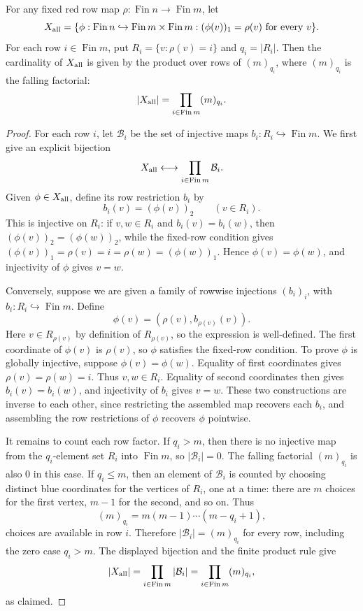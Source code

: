 \begin{lemma}
For any fixed red row map $\rho: \operatorname{Fin}n \to \operatorname{Fin}m$, let
\[
X_{\rm all}
=\{\phi:\operatorname{Fin}n\hookrightarrow
\operatorname{Fin}m\times\operatorname{Fin}m:
(\phi(v))_1=\rho(v)\text{ for every }v\}.
\]
For each row $i\in\operatorname{Fin}m$, put $R_i=\{v:\rho(v)=i\}$ and $q_i=|R_i|$.
Then the cardinality of $X_{\rm all}$ is given by the product over rows of $(m)_{q_i}$, where $(m)_{q_i}$ is the falling factorial:
\[
|X_{\rm all}| = \prod_{i\in\operatorname{Fin}m} (m)_{q_i}.
\]
\end{lemma}
\begin{proof}
For each row \(i\), let \(\mathcal B_i\) be the set of injective maps
\(b_i:R_i\hookrightarrow \operatorname{Fin}m\).  We first give an explicit
bijection
\[
X_{\rm all}\longleftrightarrow \prod_{i\in\operatorname{Fin}m}\mathcal B_i .
\]
Given \(\phi\in X_{\rm all}\), define its row restriction \(b_i\) by
\[
b_i(v)=(\phi(v))_2\qquad (v\in R_i).
\]
This is injective on \(R_i\): if \(v,w\in R_i\) and \(b_i(v)=b_i(w)\), then
\((\phi(v))_2=(\phi(w))_2\), while the fixed-row condition gives
\((\phi(v))_1=\rho(v)=i=\rho(w)=(\phi(w))_1\).  Hence
\(\phi(v)=\phi(w)\), and injectivity of \(\phi\) gives \(v=w\).

Conversely, suppose we are given a family of rowwise injections
\((b_i)_i\), with \(b_i:R_i\hookrightarrow\operatorname{Fin}m\).  Define
\[
\phi(v)=(\rho(v), b_{\rho(v)}(v)).
\]
Here \(v\in R_{\rho(v)}\) by definition of \(R_{\rho(v)}\), so the expression
is well-defined.  The first coordinate of \(\phi(v)\) is \(\rho(v)\), so
\(\phi\) satisfies the fixed-row condition.  To prove \(\phi\) is globally
injective, suppose \(\phi(v)=\phi(w)\).  Equality of first coordinates gives
\(\rho(v)=\rho(w)=i\).  Thus \(v,w\in R_i\).  Equality of second coordinates
then gives \(b_i(v)=b_i(w)\), and injectivity of \(b_i\) gives \(v=w\).
These two constructions are inverse to each other, since restricting the
assembled map recovers each \(b_i\), and assembling the row restrictions of
\(\phi\) recovers \(\phi\) pointwise.

It remains to count each row factor.  If \(q_i>m\), then there is no
injective map from the \(q_i\)-element set \(R_i\) into
\(\operatorname{Fin}m\), so \(|\mathcal B_i|=0\).  The falling factorial
\((m)_{q_i}\) is also \(0\) in this case.  If \(q_i\le m\), then an element
of \(\mathcal B_i\) is counted by choosing distinct blue coordinates for the
vertices of \(R_i\), one at a time: there are \(m\) choices for the first
vertex, \(m-1\) for the second, and so on.  Thus
\[
(m)_{q_i}=m(m-1)\cdots(m-q_i+1),
\]
choices are available in row \(i\).  Therefore \(|\mathcal B_i|=(m)_{q_i}\)
for every row, including the zero case \(q_i>m\).  The displayed bijection
and the finite product rule give
\[
|X_{\rm all}|=\prod_{i\in\operatorname{Fin}m}|\mathcal B_i|
=\prod_{i\in\operatorname{Fin}m}(m)_{q_i},
\]
as claimed.
\end{proof}
